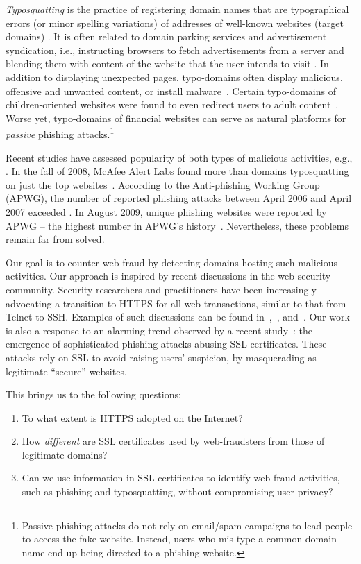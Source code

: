 \documentclass[twocolumn]{article}
\begin{document}
\emph{Typosquatting} is the practice of registering domain names that
are typographical errors (or minor spelling variations) of addresses of well-known
websites (target domains) \cite{Wang}. 
It is often related to domain parking services and advertisement syndication, i.e., instructing browsers 
to fetch advertisements from a server and blending them with content of the
website that the user intends to visit \cite{Wang}. In addition to displaying 
unexpected pages, typo-domains often display malicious, offensive and
unwanted content, or install malware~\cite{googkle,NDSS}. Certain typo-domains of 
children-oriented websites were found to even redirect users to adult content~\cite{microsoft}. Worse 
yet, typo-domains of financial websites can serve as natural
platforms for {\em passive} phishing attacks.\footnote{Passive phishing attacks do not rely on 
email/spam campaigns to lead people to access the fake website. Instead, users 
who mis-type a common domain name end up being directed to a phishing website.}

Recent studies have assessed popularity of both types of malicious activities, e.g., 
\cite{Sturgeon,spamscatter}.  In the fall of 2008, McAfee Alert
Labs found more than  domains typosquatting on just the top 
websites~\cite{mcafee}. According to the Anti-phishing Working Group (APWG),
 the number of reported phishing attacks between April 2006 and April
2007 exceeded  \cite{april07}. In  August 2009, 
unique phishing websites were reported by APWG -- the highest number in APWG's history~\cite{q3}.
Nevertheless, these problems remain far from solved. 

Our goal is to counter web-fraud by detecting domains hosting such malicious activities.
Our approach is inspired by recent discussions in the web-security community. 
Security researchers and practitioners have been increasingly advocating a transition to 
HTTPS for all web transactions, similar to that from Telnet to SSH. 
Examples of such discussions can be found in~\cite{Weaver},~\cite{Lauren}, and~\cite{httpseverywhere}. 
Our work is also a response to an alarming trend observed by a recent study~\cite{symmantec-blog}: 
the emergence of sophisticated phishing attacks abusing SSL certificates. These attacks rely on SSL 
to avoid raising users' suspicion, by masquerading as  legitimate ``secure'' websites. 

This brings us to the following questions:
\begin{enumerate}
\item To what extent is HTTPS adopted on the Internet?
\item How \emph{different} are SSL certificates used by web-fraudsters from those of legitimate domains?
\item Can we use information in SSL certificates to identify web-fraud activities, such as phishing and typosquatting, without compromising user privacy?
\end{enumerate}
\end{document}
